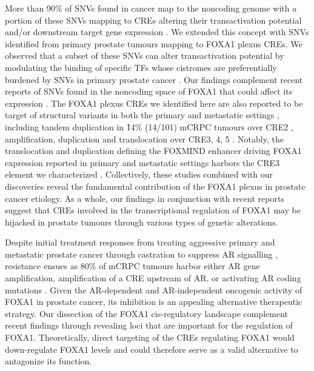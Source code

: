 More than 90\% of SNVs found in cancer map to the noncoding genome \cite{meltonRecurrentSomaticMutations2015,mazrooeiCistromePartitioningReveals2019} with a portion of these SNVs mapping to CREs altering their transactivation potential \cite{baileyNoncodingSomaticInherited2016,zhangIntegrativeFunctionalGenomics2012,huangHighlyRecurrentTERT2013,hornTERTPromoterMutations2013} and/or downstream target gene expression \cite{zhouEmergenceNoncodingCancer2016,meltonRecurrentSomaticMutations2015,weinholdGenomewideAnalysisNoncoding2014}.
We extended this concept with SNVs identified from primary prostate tumours mapping to FOXA1 plexus CREs.
We observed that a subset of these SNVs can alter transactivation potential by modulating the binding of specific TFs whose cistromes are preferentially burdened by SNVs in primary prostate cancer \cite{mazrooeiCistromePartitioningReveals2019}.
Our findings complement recent reports of SNVs found in the noncoding space of FOXA1 that could affect its expression \cite{annalaFrequentMutationFOXA12018,camcapstudygroupSequencingProstateCancers2018}.
The FOXA1 plexus CREs we identified here are also reported to be target of structural variants in both the primary and metastatic settings \cite{paroliaDistinctStructuralClasses2019,quigleyGenomicHallmarksStructural2018}, including tandem duplication in \~14\% (14/101) mCRPC tumours over CRE2 \cite{quigleyGenomicHallmarksStructural2018}, amplification, duplication and translocation over CRE3, 4, 5 \cite{paroliaDistinctStructuralClasses2019}.
Notably, the translocation and duplication defining the FOXMIND enhancer driving FOXA1 expression reported in primary and metastatic settings harbors the CRE3 element we characterized \cite{paroliaDistinctStructuralClasses2019}.
Collectively, these studies combined with our discoveries reveal the fundamental contribution of the FOXA1 plexus in prostate cancer etiology.
As a whole, our findings in conjunction with recent reports suggest that CREs involved in the transcriptional regulation of FOXA1 may be hijacked in prostate tumours through various types of genetic alterations.

Despite initial treatment responses from treating aggressive primary and metastatic prostate cancer through castration to suppress AR signalling \cite{attardProstateCancer2016}, resistance ensues as 80\% of mCRPC tumours harbor either AR gene amplification, amplification of a CRE upstream of AR, or activating AR coding mutations \cite{robinsonIntegrativeClinicalGenomics2015,takedaSomaticallyAcquiredEnhancer2018,quigleyGenomicHallmarksStructural2018}.
Given the AR-dependent \cite{yangCurrentPerspectivesFOXA12015,pomerantzAndrogenReceptorCistrome2015} and AR-independent \cite{sunkelIntegrativeAnalysisIdentifies2017} oncogenic activity of FOXA1 in prostate cancer, its inhibition is an appealing alternative therapeutic strategy.
Our dissection of the FOXA1 cis-regulatory landscape complement recent findings through revealing loci that are important for the regulation of FOXA1.
Theoretically, direct targeting of the CREs regulating FOXA1 would down-regulate FOXA1 levels and could therefore serve as a valid alternative to antagonize its function.

